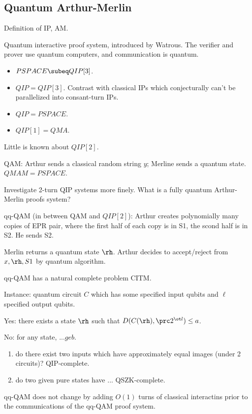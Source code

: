 \subsection{Quantum Arthur-Merlin}

Definition of IP, AM.

Quantum interactive proof system, introduced by Watrous. The verifier and prover use quantum computers, and communication is quantum.

\begin{itemize}
\item
$PSPACE\subeq QIP[3]$.
\item
$QIP=QIP[3]$. Contrast with classical IPs which conjecturally can't be parallelized into consant-turn IPs.
\item
$QIP=PSPACE$.
\item
$QIP[1]=QMA$.
\end{itemize}
Little is known about $QIP[2]$. 

QAM: Arthur sends a classical random string $y$; Merline sends a quantum state. 
$QMAM=PSPACE$.

Investigate 2-turn QIP systems more finely. What is a fully quantum Arthur-Merlin proofs system?

\begin{df}
qq-QAM (in between QAM and $QIP[2]$): Arthur creates polynomially many copies of EPR pair, where the first half of each copy is in S1, the scond half is in S2. He sends S2.

Merlin returns a quantum state $\rh$. Arthur decides to accept/reject from $x,\rh,S1$ by quantum algorithm.
\end{df}

qq-QAM has a natural complete problem CITM.
\begin{df}
Instance: quantum circuit $C$ which has some specified input qubits and $\ell$ specified output qubits.

Yes: there exists a state $\rh$ such that $D(C(\rh),\prc2^{\ot l})\le a$.

No: for any state, $...ge b$.
\end{df}
\begin{enumerate}
\item
do there exist two inputs which have approximately equal images (under 2 circuits)? QIP-complete.
\item
do two given pure states have ... QSZK-complete.
\end{enumerate}

\begin{thm}
qq-QAM does not change by adding $O(1)$ turns of classical interactins prior to the communications of the qq-QAM proof system.
\end{thm}

